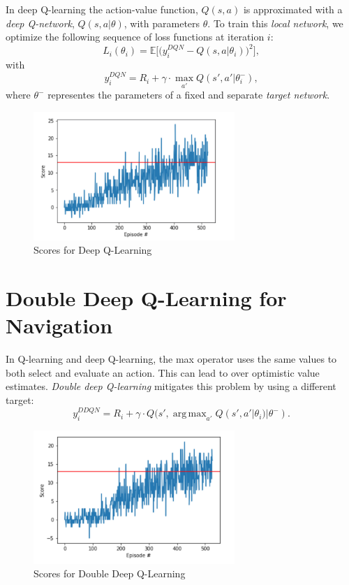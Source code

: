 \documentclass[tog]{acmsiggraph}
\begin{document}
In deep Q-learning the action-value function, $Q(s,a)$ is approximated with a {\em deep Q-network},
$Q(s,a|\theta)$, with parameters $\theta$.  To train this {\em local network}, we optimize the following sequence
of loss functions at iteration $i$:
$$L_i(\theta_i) = \mathbb{E}\big[\big(y_i^{DQN}-Q(s,a|\theta_i)\big)^2\big],$$
with 
$$ y_i^{DQN}=R_i+\gamma\cdot\max_{a'}Q(s',a'|\theta^-_i),$$
where $\theta^-$ representes the parameters of a fixed and separate {\em target network}.

\FloatBarrier
\begin{figure}[h]
	\centering
	\includegraphics[width=3.0in]{images/dqn-scores}
	\caption{Scores for Deep Q-Learning}
	\label{fig:ferrari}
\end{figure}
\FloatBarrier

\section{ Double Deep Q-Learning for Navigation}

In Q-learning and deep Q-learning, the max operator uses the same values to both select and evaluate an action. 
This can lead to over optimistic value estimates.  {\em Double deep Q-learning} mitigates this problem by using a different target:
$$ y_i^{DDQN}=R_i+\gamma\cdot Q(s',  \operatorname{arg\,max}_{a'} Q(s',a'|\theta_i)|\theta^-).$$

\begin{figure}[h]
	\centering
	\includegraphics[width=3.0in]{images/double-dqn-scores}
	\caption{Scores for Double Deep Q-Learning}
	\label{fig:ferrari}
\end{figure}
\end{document}
